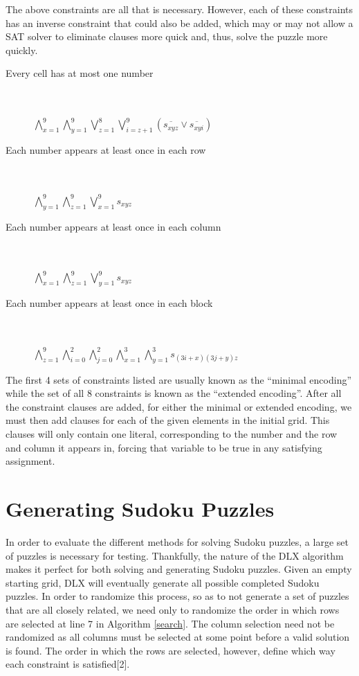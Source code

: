 \documentclass[12pt]{article}
\newcounter{row}
\newcounter{col}
\begin{document}
The above constraints are all that is necessary. However, each of these constraints has an inverse constraint that could also be added, which may or may not allow a SAT solver to eliminate clauses more quick and, thus, solve the puzzle more quickly.
\pagebreak
\begin{description}
\item[Every cell has at most one number] \hfill \\ \\
$\bigwedge\limits_{x=1}^{9} \bigwedge\limits_{y=1}^{9} \bigvee\limits_{z=1}^{8} \bigvee\limits_{i=z+1}^{9} (\overline{s_{xyz}} \vee \overline{s_{xyi}})$
\item[Each number appears at least once in each row] \hfill \\ \\
$\bigwedge\limits_{y=1}^{9} \bigwedge\limits_{z=1}^{9} \bigvee\limits_{x=1}^{9}   s_{xyz}$
\item[Each number appears at least once in each column] \hfill \\ \\
$\bigwedge\limits_{x=1}^{9} \bigwedge\limits_{z=1}^{9} \bigvee\limits_{y=1}^{9} s_{xyz}$
\item[Each number appears at least once in each block] \hfill \\ \\
$\bigwedge\limits_{z=1}^{9} \bigwedge\limits_{i=0}^{2} \bigwedge\limits_{j=0}^{2} \bigwedge\limits_{x=1}^{3} \bigwedge\limits_{y=1}^{3} s_{(3i+x)(3j+y)z}$
\end{description}
The first 4 sets of constraints listed are usually known as the ``minimal encoding'' while the set of all 8 constraints is known as the ``extended encoding''. After all the constraint clauses are added, for either the minimal or extended encoding, we must then add clauses for each of the given elements in the initial grid. This clauses will only contain one literal, corresponding to the number and the row and column it appears in, forcing that variable to be true in any satisfying assignment.

\section{Generating Sudoku Puzzles}
In order to evaluate the different methods for solving Sudoku puzzles, a large set of puzzles is necessary for testing. Thankfully, the nature of the DLX algorithm makes it perfect for both solving and generating Sudoku puzzles. Given an empty starting grid, DLX will eventually generate all possible completed Sudoku puzzles. In order to randomize this process, so as to not generate a set of puzzles that are all closely related, we need only to randomize the order in which rows are selected at line 7 in Algorithm \ref{search}. The column selection need not be randomized as all columns must be selected at some point before a valid solution is found. The order in which the rows are selected, however, define which way each constraint is satisfied[2]. \\
\end{document}
